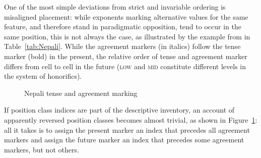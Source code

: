 \documentclass[output=paper
	        ,collection
	        ,collectionchapter
 	        ,biblatex
                ,babelshorthands
                ,newtxmath
                ,draftmode
                ,colorlinks, citecolor=brown
]{langscibook}
\begin{document}
\begin{exe}
\begin{xlist}
\begin{exe}
\begin{xlist}
One of the most simple deviations from strict and invariable ordering
is misaligned placement: while exponents marking alternative values
for the same feature, and therefore stand in paradigmatic opposition,
tend to occur in the same position, this is not always the case, as
illustrated by the example from  in Table~\ref{tab:Nepali}.  
While the agreement markers (in italics) follow the tense marker (bold) in the present,
the relative order of tense and agreement marker differs from cell to
cell in the future (\textsc{low} and \textsc{mid} constitute
different levels in the system of honorifics).

\begin{figure}[htb]
  \centering
    \caption{Nepali tense and agreement marking}\label{fig:AnalysisNepali}
\end{figure}

If position class indices are part of the descriptive inventory, an
account of apparently reversed position classes \citep{Stump93}
becomes almost trivial, as shown in Figure~\ref{fig:AnalysisNepali}:
all it takes is to assign the present marker an index that precedes
all agreement markers and assign the future marker an index that
precedes some agreement markers, but not others.


\end{xlist}
\end{exe}
\end{xlist}
\end{exe}
\end{document}
